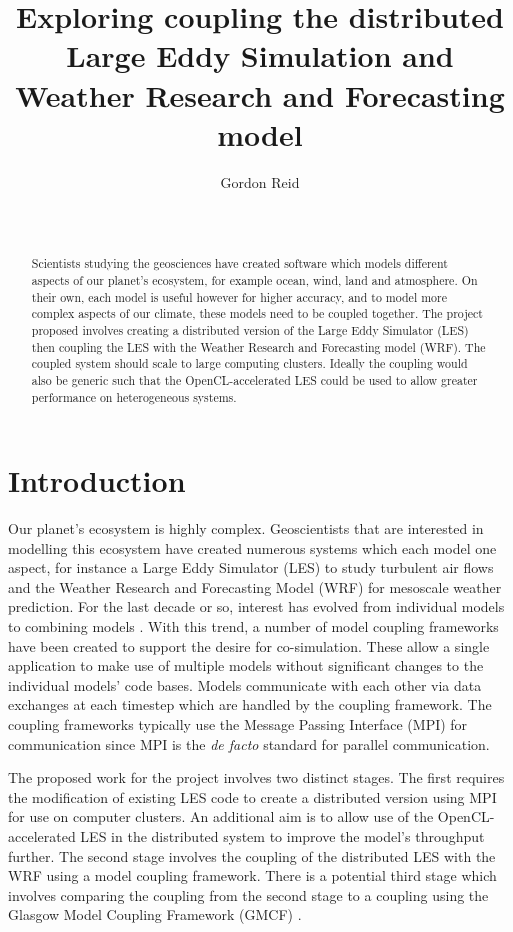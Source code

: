 \documentclass{acm_proc_article-sp}
\title{Exploring coupling the distributed Large Eddy Simulation and Weather
Research and Forecasting model}
\author{
    \alignauthor
    Gordon Reid\\
    \affaddr{School of Computing Science}\\
    \affaddr{University of Glasgow}\\
    \email{1002536r@student.gla.ac.uk}
}
\renewcommand{\_}{\underscore\hspace{0pt}}
\begin{document}
\maketitle

\begin{abstract}

Scientists studying the geosciences have created software which models different
aspects of our planet's ecosystem, for example ocean, wind, land and atmosphere.
On their own, each model is useful however for higher accuracy, and to model
more complex aspects of our climate, these models need to be coupled together.
The project proposed involves creating a distributed version of the Large Eddy
Simulator (LES) then coupling the LES with the Weather Research and Forecasting
model (WRF). The coupled system should scale to large computing clusters.
Ideally the coupling would also be generic such that the OpenCL-accelerated LES
could be used to allow greater performance on heterogeneous systems.

\end{abstract}

\section*{Introduction}

Our planet's ecosystem is highly complex. Geoscientists that are interested in
modelling this ecosystem have created numerous systems which each model one
aspect, for instance a Large Eddy Simulator (LES) to study turbulent air flows
\cite{Nakayama2011,Nakayama2012} and the Weather Research and Forecasting Model
(WRF) for mesoscale weather prediction. For the last decade or so, interest has
evolved from individual models to combining models \cite{Michalakes2010}. With
this trend, a number of model coupling frameworks have been created to support
the desire for co-simulation. These allow a single application to make use of
multiple models without significant changes to the individual models' code
bases. Models communicate with each other via data exchanges at each timestep
which are handled by the coupling framework. The coupling frameworks typically
use the Message Passing Interface (MPI) for communication since MPI is the
\textit{de facto} standard for parallel communication.

The proposed work for the project involves two distinct stages. The first
requires the modification of existing LES code to create a distributed version
using MPI for use on computer clusters. An additional aim is to allow use of the
OpenCL-accelerated LES \cite{Vanderbauwhede2014} in the distributed system to
improve the model's throughput further. The second stage involves the coupling
of the distributed LES with the WRF using a model coupling framework. There is a
potential third stage which involves comparing the coupling from the second
stage to a coupling using the Glasgow Model Coupling Framework (GMCF)
\cite{Vanderbauwhede2014}.
\end{document}
